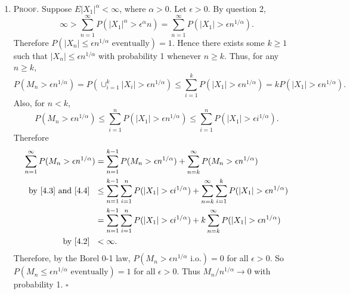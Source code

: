 \documentclass[12pt]{article}
\newcounter{ProofCounter}
\newenvironment{Proof}{\stepcounter{ProofCounter}\textsc{Proof.}}{\hfill$\square$}
\begin{document}
\begin{enumerate}[label=(\alph*)]
\item \begin{Proof}
Suppose $E|X_{1}|^{\alpha} < \infty$, where $\alpha > 0$. Let $\epsilon > 0$. By question 2,
\begin{equation}
\infty > \sum_{n=1}^{\infty}P(|X_{1}|^{\alpha} > \epsilon^{\alpha}n) = \sum_{n=1}^{\infty}P(|X_{1}| > \epsilon n^{1/\alpha}). 
\label{4.2}
\end{equation}
Therefore $P(|X_{n}| \leq \epsilon n^{1/\alpha} \text{ eventually}) = 1$. Hence there exists some $k \geq 1$ such that $|X_{n}| \leq \epsilon
n^{1/\alpha}$ with probability 1 whenever $n \geq k$. Thus, for any $n \geq k$,
\begin{equation}
P(M_{n} > \epsilon n^{1/\alpha}) = P\left( \cup_{i=1}^{k}|X_{i}| > \epsilon n^{1/\alpha} \right) \leq \sum_{i=1}^{k}P(|X_{1}| > \epsilon
n^{1/\alpha}) = kP(|X_{1}| > \epsilon n^{1/\alpha}). 
\label{4.3}
\end{equation}
Also, for $n < k$, 
\begin{equation}
P(M_{n} > \epsilon n^{1/\alpha}) \leq \sum_{i=1}^{n}P(|X_{1}| > \epsilon n^{1/\alpha}) \leq \sum_{i=1}^{n}P(|X_{1}| > \epsilon i^{1/\alpha}).
\label{4.4}
\end{equation}
Therefore 
\begin{align*}
\sum_{n=1}^{\infty}P(M_{n} > \epsilon n^{1/\alpha}) & = \sum_{n=1}^{k-1}P(M_{n} > \epsilon n^{1/\alpha}) + \sum_{n=k}^{\infty}P(M_{n} > \epsilon
n^{1/\alpha})  \\
\text{by \eqref{4.3} and \eqref{4.4} }\ & \leq \sum_{n=1}^{k-1}\sum_{i=1}^{n}P(|X_{1}| > \epsilon i^{1/\alpha}) + \sum_{n=k}^{\infty}\sum_{i=1}^{k}P(|X_{1}| > \epsilon n^{1/\alpha}) \\
& = \sum_{n=1}^{k-1}\sum_{i=1}^{n}P(|X_{1}| > \epsilon i^{1/\alpha}) + k\sum_{n=k}^{\infty}P(|X_{1}| > \epsilon n^{1/\alpha}) \\
\text{by \eqref{4.2} }\ & < \infty.
\end{align*}
Therefore, by the Borel 0-1 law, $P(M_{n} > \epsilon n^{1/\alpha}\text{ i.o.}) = 0$ for all $\epsilon > 0$. So $P(M_{n} \leq \epsilon
n^{1/\alpha}\text{ eventually}) = 1$ for all $\epsilon > 0$. Thus $M_{n}/n^{1/\alpha} \rightarrow 0$ with probability 1.
\end{Proof}


\end{enumerate}
\end{document}
